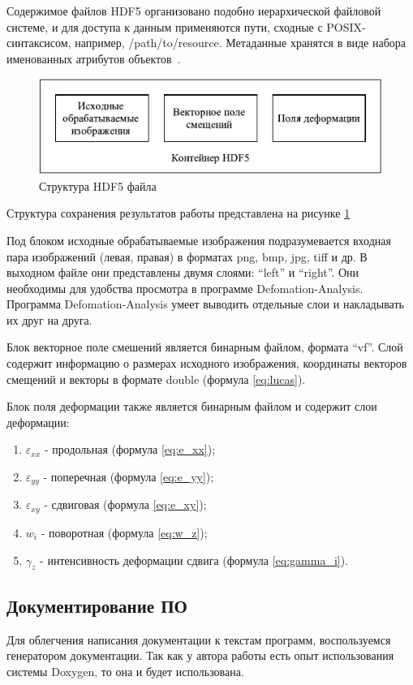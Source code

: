 Содержимое файлов HDF5 организовано подобно иерархической файловой системе, и для доступа к данным применяются пути, сходные с POSIX-синтаксисом, например, /path/to/resource. Метаданные хранятся в виде набора именованных атрибутов объектов~\cite{hdf5}.

\begin{figure}
\centering
\includegraphics[width=0.7\linewidth]{images/structHDF5.pdf}
\caption{Структура HDF5 файла}
\label{fig:structHDF5}
\end{figure}

Структура сохранения результатов работы представлена на рисунке \ref{fig:structHDF5}

Под блоком исходные обрабатываемые изображения подразумевается входная пара изображений (левая, правая) в форматах png, bmp, jpg, tiff и др. В выходном файле они представлены двумя слоями: ``left'' и ``right''. Они необходимы для удобства просмотра в программе Defomation-Analysis. Программа Defomation-Analysis умеет выводить отдельные слои и накладывать их друг на друга.

Блок векторное поле смешений является бинарным файлом, формата ``vf''. Слой содержит информацию о размерах исходного изображения, координаты векторов смещений и векторы в формате double (формула \ref{eq:lucas}).

Блок поля деформации также является бинарным файлом и содержит слои деформации:
\begin{enumerate}
\item $\varepsilon_{xx}$ - продольная (формула \ref{eq:e_xx});
\item $\varepsilon_{yy}$ - поперечная (формула \ref{eq:e_yy});
\item $\varepsilon_{xy}$ - сдвиговая (формула \ref{eq:e_xy});
\item $w_{i}$ - поворотная (формула \ref{eq:w_z});
\item $\gamma_z$ - интенсивность деформации сдвига (формула \ref{eq:gamma_i}).
\end{enumerate}

\subsection{Документирование ПО}
Для облегчения написания документации к текстам программ, воспользуемся генератором документации. Так как у автора работы есть опыт использования системы Doxygen, то она и будет использована.

